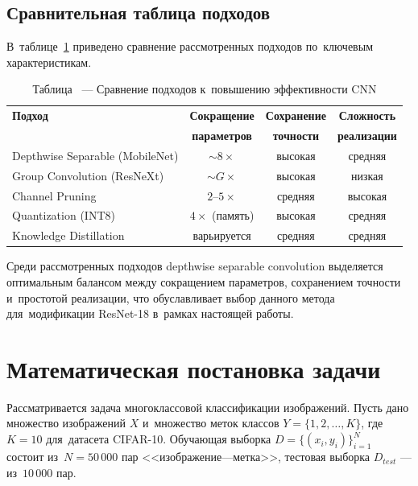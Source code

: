 \subsection{Сравнительная таблица подходов}

В~таблице~\ref{tab:lit_comparison} приведено сравнение рассмотренных подходов по~ключевым характеристикам.

\begin{table}[H]
    \centering
    \caption*{\raggedleft Таблица \thetable\ --- Сравнение подходов к~повышению эффективности CNN}
    \label{tab:lit_comparison}
    \begin{tabular}{|l|c|c|c|}
        \hline
        \textbf{Подход} & \textbf{Сокращение} & \textbf{Сохранение} & \textbf{Сложность} \\
        & \textbf{параметров} & \textbf{точности} & \textbf{реализации} \\
        \hline
        Depthwise Separable (MobileNet) & $\sim8\times$ & высокая & средняя \\
        \hline
        Group Convolution (ResNeXt) & $\sim G\times$ & высокая & низкая \\
        \hline
        Channel Pruning & $2$--$5\times$ & средняя & высокая \\
        \hline
        Quantization (INT8) & $4\times$ (память) & высокая & средняя \\
        \hline
        Knowledge Distillation & варьируется & средняя & средняя \\
        \hline
    \end{tabular}
\end{table}

Среди рассмотренных подходов depthwise separable convolution выделяется оптимальным балансом между сокращением параметров, сохранением точности и~простотой реализации, что обуславливает выбор данного метода для~модификации ResNet-18 в~рамках настоящей работы.

\newpage
\section{Математическая постановка задачи}

Рассматривается задача многоклассовой классификации изображений. Пусть
дано множество изображений $X$ и~множество меток классов
$Y = \{1, 2, \dots, K\}$, где $K = 10$ для~датасета CIFAR-10.
Обучающая выборка $D = \{(x_i, y_i)\}_{i=1}^{N}$ состоит из~$N
= 50\,000$ пар <<изображение—метка>>, тестовая выборка
$D_{test}$ — из~$10\,000$ пар.

